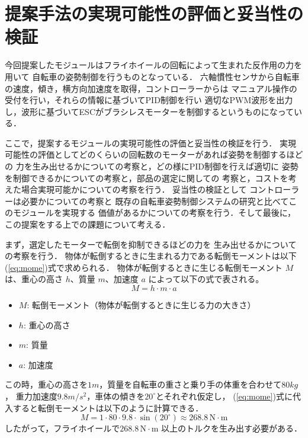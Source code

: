 \documentclass[uplatex,dvipdfmx]{jsarticle}
\begin{document}


\section{提案手法の実現可能性の評価と妥当性の検証}
今回提案したモジュールはフライホイールの回転によって生まれた反作用の力を用いて
自転車の姿勢制御を行うものとなっている．
六軸慣性センサから自転車の速度，傾き，横方向加速度を取得，コントローラーからは
マニュアル操作の受付を行い，それらの情報に基づいてPID制御を行い
適切なPWM波形を出力し，波形に基づいてESCがブラシレスモーターを制御するというものになっている．

ここで，提案するモジュールの実現可能性の評価と妥当性の検証を行う．
実現可能性の評価としてどのくらいの回転数のモーターがあれば姿勢を制御するほどの
力を生み出せるかについての考察と，どの様にPID制御を行えば適切に
姿勢を制御できるかについての考察と，部品の選定に関しての
考察と，コストを考えた場合実現可能かについての考察を行う．
妥当性の検証として
コントローラーは必要かについての考察と
既存の自転車姿勢制御システムの研究と比べてこのモジュールを実現する
価値があるかについての考察を行う．そして最後に，この提案をする上での課題について考える．

まず，選定したモーターで転倒を抑制できるほどの力を
生み出せるかについての考察を行う．
物体が転倒するときに生まれる力である転倒モーメントは以下(\ref{eq:mome})式で求められる．
物体が転倒するときに生じる転倒モーメント \( M \) は、重心の高さ \( h \)、質量 \( m \)、加速度 \( a \) によって以下の式で表される。
\begin{equation}
M = h \cdot m \cdot a
\label{eq:mome}
\end{equation}
\begin{itemize}
    \item \( M \): 転倒モーメント（物体が転倒するときに生じる力の大きさ）
    \item \( h \): 重心の高さ
    \item \( m \): 質量
    \item \( a \): 加速度
\end{itemize}
この時，重心の高さを$1m$，質量を自転車の重さと乗り手の体重を合わせて$80kg$，
重力加速度$9.8m/s^2$，車体の傾きを$20^\circ$とそれぞれ仮定し，
(\ref{eq:mome})式に代入すると転倒モーメントは以下のように計算できる．
\[
M = 1 \cdot 80 \cdot 9.8 \cdot \sin(20^\circ) \approx 268.8 \, \mathrm{N \cdot m}
\]
したがって，フライホイールで$ 268.8 \, \mathrm{N \cdot m} $ 以上のトルクを生み出す必要がある．
\end{document}
